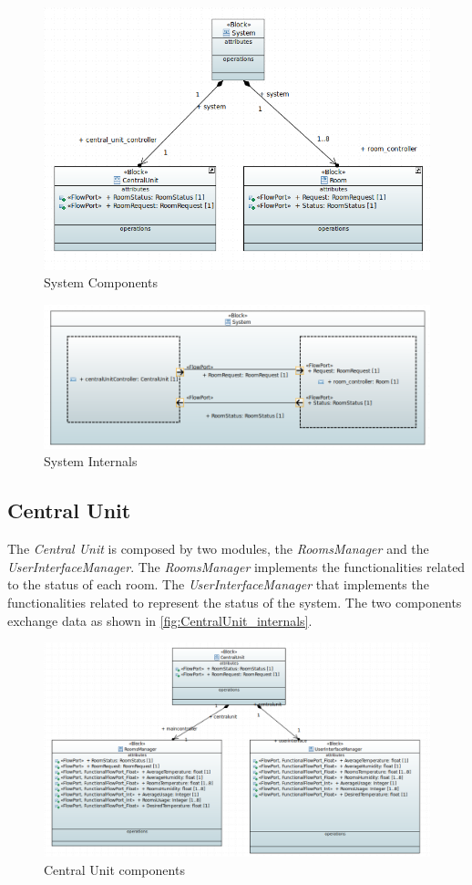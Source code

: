 \begin{figure}[H]
	\centering
	\includegraphics[width=12cm,keepaspectratio]{img/sysml/SystemComponents}
	\caption{System Components}
	\label{fig:SystemComponents}
\end{figure}
\begin{figure}[H]
	\centering
	\includegraphics[width=12cm,keepaspectratio]{img/sysml/SystemInternals}
	\caption{System Internals}
	\label{fig:SystemInternals}
\end{figure}

\subsection{Central Unit}
The \textit{Central Unit} is composed by two modules, the \textit{RoomsManager} and the \textit{UserInterfaceManager}.
The \textit{RoomsManager} implements the functionalities related to the status of each room.
The \textit{UserInterfaceManager} that implements the functionalities related to represent the status of the system.
The two components exchange data as shown in \ref{fig:CentralUnit_internals}.
\begin{figure}[H]
	\centering
	\includegraphics[width=12cm,keepaspectratio]{img/sysml/CentralUnitComponents}
	\caption{Central Unit components}
	\label{fig:CentralUnit_components}
\end{figure}

